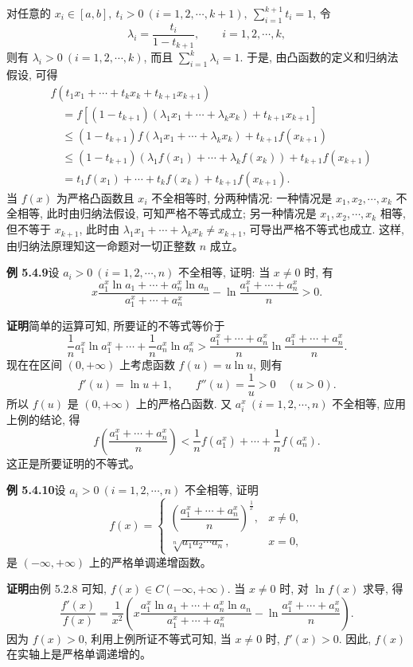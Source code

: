 \documentclass[UTF8, 12pt, fontset=fandol, oneside]{ctexart}
\begin{document}
对任意的 $x_i\in[a,b],\ t_i>0\ (i=1,2,\cdots,k+1),\ \sum_{i=1}^{k+1}t_i=1$, 令
\[
  \lambda_i=\frac{t_i}{1-t_{k+1}},\qquad i=1,2,\cdots,k,
\]
则有 $\lambda_i>0\ (i=1,2,\cdots,k)$, 而且 $\sum_{i=1}^k\lambda_i=1$. 于是, 由凸函数的定义和归纳法假设, 可得
\[
\begin{aligned}
  &f(t_1x_1+\cdots+t_kx_k+t_{k+1}x_{k+1})\\
  &\quad=f[(1-t_{k+1})(\lambda_1x_1+\cdots+\lambda_kx_k)+t_{k+1}x_{k+1}]\\
  &\quad\le(1-t_{k+1})f(\lambda_1x_1+\cdots+\lambda_kx_k)+t_{k+1}f(x_{k+1})\\
  &\quad\le(1-t_{k+1})(\lambda_1f(x_1)+\cdots+\lambda_kf(x_k))+t_{k+1}f(x_{k+1})\\
  &\quad=t_1f(x_1)+\cdots+t_kf(x_k)+t_{k+1}f(x_{k+1}).
\end{aligned}
\]
当 $f(x)$ 为严格凸函数且 $x_i$ 不全相等时, 分两种情况: 一种情况是 $x_1,x_2,\cdots,x_k$ 不全相等, 此时由归纳法假设, 可知严格不等式成立; 另一种情况是 $x_1,x_2,\cdots,x_k$ 相等, 但不等于 $x_{k+1}$, 此时由 $\lambda_1x_1+\cdots+\lambda_kx_k\ne x_{k+1}$, 可导出严格不等式也成立. 这样, 由归纳法原理知这一命题对一切正整数 $n$ 成立。

\noindent\textbf{例 5.4.9}\quad 设 $a_i>0\ (i=1,2,\cdots,n)$ 不全相等, 证明: 当 $x\ne0$ 时, 有
\[
  x\frac{a_1^x\ln a_1+\cdots+a_n^x\ln a_n}{a_1^x+\cdots+a_n^x}
  -\ln\frac{a_1^x+\cdots+a_n^x}{n}>0.
\]

\noindent\textbf{证明}\quad 简单的运算可知, 所要证的不等式等价于
\[
  \frac1n a_1^x\ln a_1^x+\cdots+\frac1n a_n^x\ln a_n^x
  >\frac{a_1^x+\cdots+a_n^x}{n}\ln\frac{a_1^x+\cdots+a_n^x}{n}.
\]
现在在区间 $(0,+\infty)$ 上考虑函数 $f(u)=u\ln u$, 则有
\[
  f'(u)=\ln u+1,\qquad f''(u)=\frac1u>0\quad (u>0).
\]
所以 $f(u)$ 是 $(0,+\infty)$ 上的严格凸函数. 又 $a_i^x\ (i=1,2,\cdots,n)$ 不全相等, 应用上例的结论, 得
\[
  f\left(\frac{a_1^x+\cdots+a_n^x}{n}\right)
  <\frac1n f(a_1^x)+\cdots+\frac1n f(a_n^x).
\]
这正是所要证明的不等式。

\noindent\textbf{例 5.4.10}\quad 设 $a_i>0\ (i=1,2,\cdots,n)$ 不全相等, 证明
\[
  f(x)=
  \begin{cases}
    \left(\dfrac{a_1^x+\cdots+a_n^x}{n}\right)^{\frac1x}, & x\ne0,\\[6pt]
    \sqrt[n]{a_1a_2\cdots a_n}, & x=0,
  \end{cases}
\]
是 $(-\infty,+\infty)$ 上的严格单调递增函数。

\noindent\textbf{证明}\quad 由例 5.2.8 可知, $f(x)\in C(-\infty,+\infty)$. 当 $x\ne0$ 时, 对 $\ln f(x)$ 求导, 得
\[
  \frac{f'(x)}{f(x)}
  =\frac1{x^2}\left(
  x\frac{a_1^x\ln a_1+\cdots+a_n^x\ln a_n}{a_1^x+\cdots+a_n^x}
  -\ln\frac{a_1^x+\cdots+a_n^x}{n}\right).
\]
因为 $f(x)>0$, 利用上例所证不等式可知, 当 $x\ne0$ 时, $f'(x)>0$. 因此, $f(x)$ 在实轴上是严格单调递增的。
\end{document}
